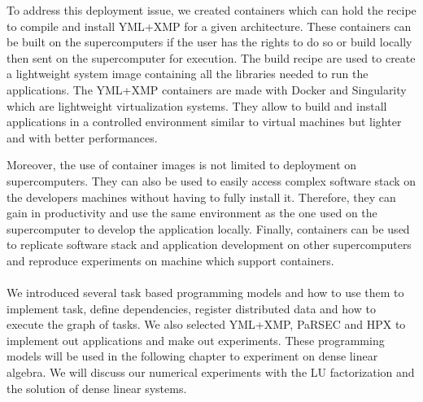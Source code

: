To address this deployment issue, we created containers which can hold the recipe to compile and install YML+XMP for a given architecture.
These containers can be built on the supercomputers if the user has the rights to do so or build locally then sent on the supercomputer for execution.
The build recipe are used to create a lightweight system image containing all the libraries needed to run the applications.
The YML+XMP containers are made with Docker and Singularity which are lightweight virtualization systems.
They allow to build and install applications in a controlled environment similar to virtual machines but lighter and with better performances.

Moreover, the use of container images is not limited to deployment on supercomputers.
They can also be used to easily access complex software stack on the developers machines without having to fully install it.
Therefore, they can gain in productivity and use the same environment as the one used on the supercomputer to develop the application locally.
Finally, containers can be used to replicate software stack and application development on other supercomputers and reproduce experiments on machine which support containers.


\paragraph{}
We introduced several task based programming models and how to use them to implement task, define dependencies, register distributed data and how to execute the graph of tasks.
We also selected YML+XMP, PaRSEC and HPX to implement out applications and make out experiments.
These programming models will be used in the following chapter to experiment on dense linear algebra.
We will discuss our numerical experiments with the LU factorization and the solution of dense linear systems.
